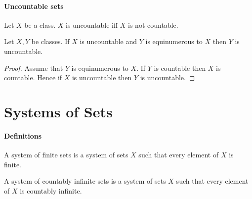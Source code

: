 \documentclass[10pt]{article}
\begin{document}
  \paragraph{Uncountable sets}

  \begin{forthel}
    \begin{definition}
      Let $X$ be a class.
      $X$ is uncountable iff $X$ is not countable.
    \end{definition}
  \end{forthel}

  \begin{forthel}
    \begin{proposition}
      Let $X, Y$ be classes.
      If $X$ is uncountable and $Y$ is equinumerous to $X$ then $Y$ is
      uncountable.
    \end{proposition}
    \begin{proof}
      Assume that $Y$ is equinumerous to $X$.
      If $Y$ is countable then $X$ is countable.
      Hence if $X$ is uncountable then $Y$ is uncountable.
    \end{proof}
  \end{forthel}


  \section{Systems of Sets}

  \paragraph{Definitions}

  \begin{forthel}
    \begin{definition}
      A system of finite sets is a system of sets $X$ such that every element of
      $X$ is finite.
    \end{definition}
  \end{forthel}

  \begin{forthel}
    \begin{definition}
      A system of countably infinite sets is a system of sets $X$ such that
      every element of $X$ is countably infinite.
    \end{definition}
  \end{forthel}
\end{document}
